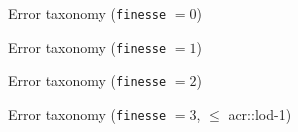 \documentclass[10pt]{beamer}
\begin{document}
            \begin{frame}{Error taxonomy (\texttt{finesse} $= 0$)}
                
            \end{frame}
            \begin{frame}{Error taxonomy (\texttt{finesse} $= 1$)}
                
            \end{frame}
                \begin{frame}{Error taxonomy (\texttt{finesse} $= 2$)}
            \only<1|handout:0>{
                
            }
        \end{frame}
        \begin{frame}{Error taxonomy (\texttt{finesse} $= 3$, $\leq$ \acrshort{acr::lod}-1)}
            
        \end{frame}
\end{document}
